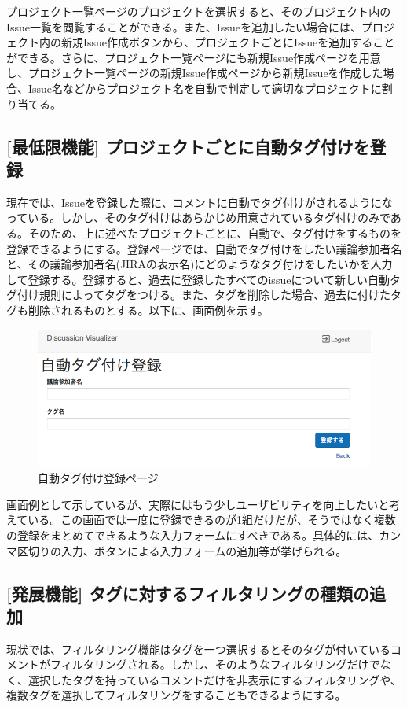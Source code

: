 \documentclass[12pt, oneside]{jreport}
\begin{document}
		プロジェクト一覧ページのプロジェクトを選択すると、そのプロジェクト内のIssue一覧を閲覧することができる。また、Issueを追加したい場合には、プロジェクト内の新規Issue作成ボタンから、プロジェクトごとにIssueを追加することができる。さらに、プロジェクト一覧ページにも新規Issue作成ページを用意し、プロジェクト一覧ページの新規Issue作成ページから新規Issueを作成した場合、Issue名などからプロジェクト名を自動で判定して適切なプロジェクトに割り当てる。
		
		\subsection{[最低限機能] プロジェクトごとに自動タグ付けを登録}
		現在では、Issueを登録した際に、コメントに自動でタグ付けがされるようになっている。しかし、そのタグ付けはあらかじめ用意されているタグ付けのみである。そのため、上に述べたプロジェクトごとに、自動で、タグ付けをするものを登録できるようにする。登録ページでは、自動でタグ付けをしたい議論参加者名と、その議論参加者名(JIRAの表示名)にどのようなタグ付けをしたいかを入力して登録する。登録すると、過去に登録したすべてのissueについて新しい自動タグ付け規則によってタグをつける。また、タグを削除した場合、過去に付けたタグも削除されるものとする。以下に、画面例を示す。
		\begin{figure}[H]
		\centering
		\includegraphics[width=17cm,bb=500 300 -200 27]{TagAdd.png}
		\caption{自動タグ付け登録ページ}
		\end{figure}
		
		画面例として示しているが、実際にはもう少しユーザビリティを向上したいと考えている。この画面では一度に登録できるのが1組だけだが、そうではなく複数の登録をまとめてできるような入力フォームにすべきである。具体的には、カンマ区切りの入力、ボタンによる入力フォームの追加等が挙げられる。

		\subsection{[発展機能] タグに対するフィルタリングの種類の追加}
		現状では、フィルタリング機能はタグを一つ選択するとそのタグが付いているコメントがフィルタリングされる。しかし、そのようなフィルタリングだけでなく、選択したタグを持っているコメントだけを非表示にするフィルタリングや、複数タグを選択してフィルタリングをすることもできるようにする。
\end{document}
